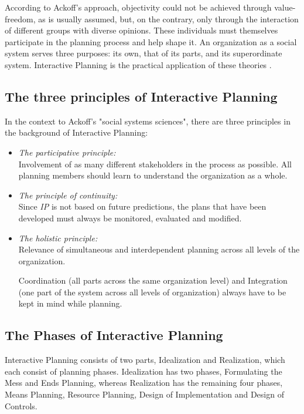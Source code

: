 \documentclass[a4paper,12pt]{article}
\begin{document}
According to Ackoff's approach, objectivity could not be achieved through
value-freedom, as is usually assumed, but, on the contrary, only through the
interaction of different groups with diverse opinions. These individuals must
themselves participate in the planning process and help shape it. An
organization as a social system serves three purposes: its own, that of its
parts, and its superordinate system. Interactive Planning is the practical
application of these theories \cite{jackson:2003}.

\subsection{The three principles of Interactive Planning}
In the context to Ackoff's "social systems sciences", there are three
principles in the background of Interactive Planning:
\begin{itemize}
\item \emph{The participative principle:} \\Involvement of as many different
  stakeholders in the process as possible. All planning members should learn
  to understand the organization as a whole.

\item \emph{The principle of continuity:}\\Since \textit{IP} is not based on
  future predictions, the plans that have been developed must always be
  monitored, evaluated and modified.

\item \emph{The holistic principle:}\\Relevance of simultaneous and
  interdependent planning across all levels of the organization.

  Coordination (all parts across the same organization level) and Integration
  (one part of the system across all levels of organization) always have to be
  kept in mind while planning.
\end{itemize}

\subsection{The Phases of Interactive Planning}

Interactive Planning consists of two parts, Idealization and Realization,
which each consist of planning phases. Idealization has two phases,
Formulating the Mess and Ends Planning, whereas Realization has the remaining
four phases, Means Planning, Resource Planning, Design of Implementation and
Design of Controls.
\end{document}

